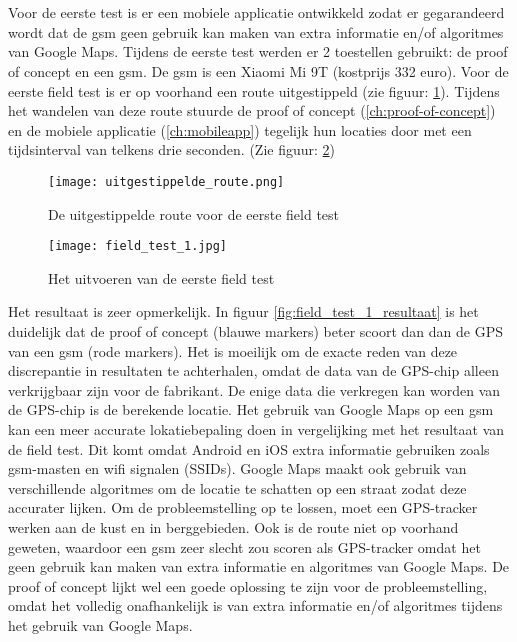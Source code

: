\section{}
Voor de eerste test is er een mobiele applicatie ontwikkeld zodat er gegarandeerd wordt dat de gsm geen gebruik kan maken van extra informatie en/of algoritmes van Google Maps.
\newline
Tijdens de eerste test werden er 2 toestellen gebruikt: de proof of concept en een gsm. De gsm is een Xiaomi Mi 9T (kostprijs 332 euro).
Voor de eerste field test is er op voorhand een route uitgestippeld (zie figuur: \ref{fig:uitgestippelde_route}). Tijdens het wandelen van deze route stuurde de proof of concept (\ref{ch:proof-of-concept}) en de mobiele applicatie (\ref{ch:mobileapp}) tegelijk hun locaties door met een tijdsinterval van telkens drie seconden. (Zie figuur: \ref{fig:field_test_1})
\begin{figure}
	\texttt{[image: uitgestippelde\_route.png]}
	\caption{De uitgestippelde route voor de eerste field test}
	\label{fig:uitgestippelde_route}
\end{figure}
\begin{figure}
	\texttt{[image: field\_test\_1.jpg]}
	\caption{Het uitvoeren van de eerste field test}
	\label{fig:field_test_1}
\end{figure}
\newline
\newline
Het resultaat is zeer opmerkelijk. In figuur \ref{fig:field_test_1_resultaat} is het duidelijk dat de proof of concept (blauwe markers) beter scoort dan dan de GPS van een gsm (rode markers). Het is moeilijk om de exacte reden van deze discrepantie in resultaten te achterhalen, omdat de data van de GPS-chip alleen verkrijgbaar zijn voor de fabrikant. De enige data die verkregen kan worden van de GPS-chip is de berekende locatie. 
\newline
Het gebruik van Google Maps op een gsm kan een meer accurate lokatiebepaling doen in vergelijking met het resultaat van de field test. Dit komt omdat Android en iOS extra informatie gebruiken zoals gsm-masten en wifi signalen (SSIDs). Google Maps maakt ook gebruik van verschillende algoritmes om de locatie te schatten op een straat zodat deze accurater lijken.
\newline
Om de probleemstelling op te lossen, moet een GPS-tracker werken aan de kust en in berggebieden. Ook is de route niet op voorhand geweten, waardoor een gsm zeer slecht zou scoren als GPS-tracker omdat het geen gebruik kan maken van extra informatie en algoritmes van Google Maps. De proof of concept lijkt wel een goede oplossing te zijn voor de probleemstelling, omdat het volledig onafhankelijk is van extra informatie en/of algoritmes tijdens het gebruik van Google Maps. 
